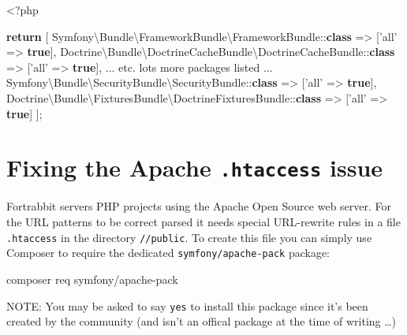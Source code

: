 \documentclass[a4paperpaper,openright]{book}
\newenvironment{Shaded}{}{}
\newcommand{\ExtensionTok}[1]{#1}
\newcommand{\KeywordTok}[1]{\textcolor[rgb]{0.00,0.44,0.13}{\textbf{#1}}}
\newcommand{\NormalTok}[1]{#1}
\newcommand{\OtherTok}[1]{\textcolor[rgb]{0.00,0.44,0.13}{#1}}
\newcommand{\StringTok}[1]{\textcolor[rgb]{0.25,0.44,0.63}{#1}}
\begin{document}
\begin{Shaded}
\begin{Highlighting}[]
\NormalTok{    <}\OtherTok{?}\NormalTok{php}
    
    \KeywordTok{return} \OtherTok{[}
\NormalTok{        Symfony\textbackslash{}Bundle\textbackslash{}FrameworkBundle\textbackslash{}FrameworkBundle::}\KeywordTok{class}\NormalTok{ => }\OtherTok{[}\StringTok{'all'}\NormalTok{ => }\KeywordTok{true}\OtherTok{],}
\NormalTok{        Doctrine\textbackslash{}Bundle\textbackslash{}DoctrineCacheBundle\textbackslash{}DoctrineCacheBundle::}\KeywordTok{class}\NormalTok{ => }\OtherTok{[}\StringTok{'all'}\NormalTok{ => }\KeywordTok{true}\OtherTok{],}
        \StringTok{...}\NormalTok{ etc. lots more packages listed }\StringTok{...}
\NormalTok{        Symfony\textbackslash{}Bundle\textbackslash{}SecurityBundle\textbackslash{}SecurityBundle::}\KeywordTok{class}\NormalTok{ => }\OtherTok{[}\StringTok{'all'}\NormalTok{ => }\KeywordTok{true}\OtherTok{],}
\NormalTok{        Doctrine\textbackslash{}Bundle\textbackslash{}FixturesBundle\textbackslash{}DoctrineFixturesBundle::}\KeywordTok{class}\NormalTok{ => }\OtherTok{[}\StringTok{'all'}\NormalTok{ => }\KeywordTok{true}\OtherTok{]}
    \OtherTok{];}    
\end{Highlighting}
\end{Shaded}

\hypertarget{fixing-the-apache-.htaccess-issue}{%
\section{\texorpdfstring{Fixing the Apache \texttt{.htaccess}
issue}{Fixing the Apache .htaccess issue}}\label{fixing-the-apache-.htaccess-issue}}

Fortrabbit servers PHP projects using the Apache Open Source web server.
For the URL patterns to be correct parsed it needs special URL-rewrite
rules in a file \texttt{.htaccess} in the directory \texttt{//public}.
To create this file you can simply use Composer to require the dedicated
\texttt{symfony/apache-pack} package:

\begin{Shaded}
\begin{Highlighting}[]
    \ExtensionTok{composer}\NormalTok{ req symfony/apache-pack}
\end{Highlighting}
\end{Shaded}

NOTE: You may be asked to say \texttt{yes} to install this package since
it's been created by the community (and isn't an offical package at the
time of writing \ldots{})
\end{document}
